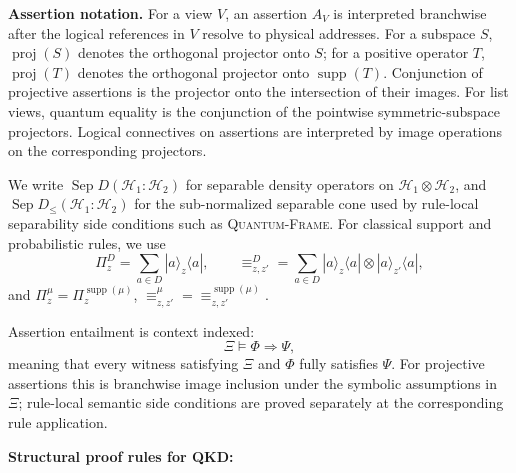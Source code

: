 \documentclass[conference,compsoc]{IEEEtran}
\newcommand{\SepD}{\operatorname{Sep}D}
\newcommand{\Supp}{\operatorname{supp}}
\begin{document}
\smallskip
\noindent\textbf{Assertion notation.}
For a view \(V\), an assertion \(A_V\) is interpreted branchwise after the
logical references in \(V\) resolve to physical addresses. For a subspace
\(S\), \(\operatorname{proj}(S)\) denotes the orthogonal projector onto \(S\);
for a positive operator \(T\), \(\operatorname{proj}(T)\) denotes the
orthogonal projector onto \(\operatorname{supp}(T)\). Conjunction of projective
assertions is the projector onto the intersection of their images. For list
views, quantum equality is the conjunction of the pointwise symmetric-subspace
projectors. Logical connectives on assertions are interpreted by image
operations on the corresponding projectors.

We write \(\SepD(\mathcal H_1:\mathcal H_2)\) for separable density operators
on \(\mathcal H_1\otimes\mathcal H_2\), and
\(\SepD_{\le}(\mathcal H_1:\mathcal H_2)\) for the sub-normalized separable
cone used by rule-local separability side conditions such as
\textsc{Quantum-Frame}. For classical support and probabilistic rules, we use
\[
\Pi_z^D=\sum_{a\in D}|a\rangle_z\langle a|,
\qquad
\equiv^D_{z,z'}=\sum_{a\in D}|a\rangle_z\langle a|\otimes|a\rangle_{z'}\langle a|,
\]
and \(\Pi_z^\mu=\Pi_z^{\Supp(\mu)}\),
\(\equiv^\mu_{z,z'}=\equiv^{\Supp(\mu)}_{z,z'}\).

Assertion entailment is context indexed:
\[
\Xi\vDash\Phi\Longrightarrow\Psi,
\]
meaning that every witness satisfying \(\Xi\) and \(\Phi\) fully satisfies
\(\Psi\). For projective assertions this is branchwise image inclusion under
the symbolic assumptions in \(\Xi\); rule-local semantic side conditions are
proved separately at the corresponding rule application.

\textbf{Structural proof rules for QKD:}
\end{document}
